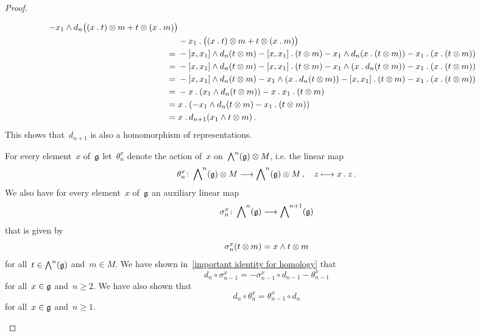 \begin{proof}
\begin{enumerate}
\begin{align*}
				- x_1 \wedge d_n\bigl( (x \mathbin{.} t) \otimes m + t \otimes (x \mathbin{.} m) \bigr)
				\\
				{}&
				- x_1 \mathbin{.} \bigl( (x \mathbin{.} t) \otimes m + t \otimes (x \mathbin{.} m) \bigr)
				\\
				={}&
				- [x, x_1] \wedge d_n(t \otimes m)
				- [x, x_1] \mathbin{.} (t \otimes m)
				- x_1 \wedge d_n( x \mathbin{.} (t \otimes m) )
				- x_1 \mathbin{.} ( x \mathbin{.} (t \otimes m) )
				\\
				={}&
				- [x, x_1] \wedge d_n(t \otimes m)
				- [x, x_1] \mathbin{.} (t \otimes m)
				- x_1 \wedge ( x \mathbin{.} d_n(t \otimes m) )
				- x_1 \mathbin{.} ( x \mathbin{.} (t \otimes m) )
				\\
				={}&
				- [x, x_1] \wedge d_n(t \otimes m)
				- x_1 \wedge ( x \mathbin{.} d_n(t \otimes m) )
				- [x, x_1] \mathbin{.} (t \otimes m)
				- x_1 \mathbin{.} ( x \mathbin{.} (t \otimes m) )
				\\
				={}&
				- x \mathbin{.} ( x_1 \wedge d_n(t \otimes m) )
				- x \mathbin{.} x_1 \mathbin{.} (t \otimes m)
				\\
				={}&
				x \mathbin{.} ( - x_1 \wedge d_n(t \otimes m) - x_1 \mathbin{.} (t \otimes m) )
				\\
				={}&
				x \mathbin{.} d_{n+1}( x_1 \wedge t \otimes m ) \,.
			\end{align*}
			\endgroup
			This shows that~$d_{n+1}$ is also a homomorphism of representations.

			For every element~$x$ of~$\mathfrak{g}$ let~$\theta_n^x$ denote the action of~$x$ on~$\operatorname{\bigwedge}^n(\mathfrak{g}) \otimes M$, i.e. the linear map
			\[
				\theta_n^x
				\colon
				\Exterior^n(\glie) \tensor M
				\to
				\Exterior^n(\glie) \tensor M \,,
				\quad
				z
				\mapsto
				x \act z \,.
			\]
			We also have for every element~$x$ of~$\mathfrak{g}$ an auxiliary linear map
			\[
				\sigma_n^x
				\colon
				\Exterior^n(\glie)
				\to
				\Exterior^{n+1}(\glie)
			\]
			that is given by
			\[
				\sigma_n^x( t \otimes m)
				=
				x \wedge t \otimes m
			\]
			for all~$t \in \operatorname{\bigwedge}^n(\mathfrak{g})$ and~$m \in M$.
			We have shown in~\eqref{important identity for homology} that
			\[
				d_n \circ \sigma_{n-1}^x
				=
				- \sigma_{n-1}^x \circ d_{n-1}
				- \theta_{n-1}^x
			\]
			for all~$x \in \mathfrak{g}$ and~$n \geq 2$.
			We have also shown that
			\[
				d_n \circ \theta_n^x
				=
				\theta_{n-1}^x \circ d_n
			\]
			for all~$x \in \mathfrak{g}$ and~$n \geq 1$.


\end{enumerate}
\end{proof}
